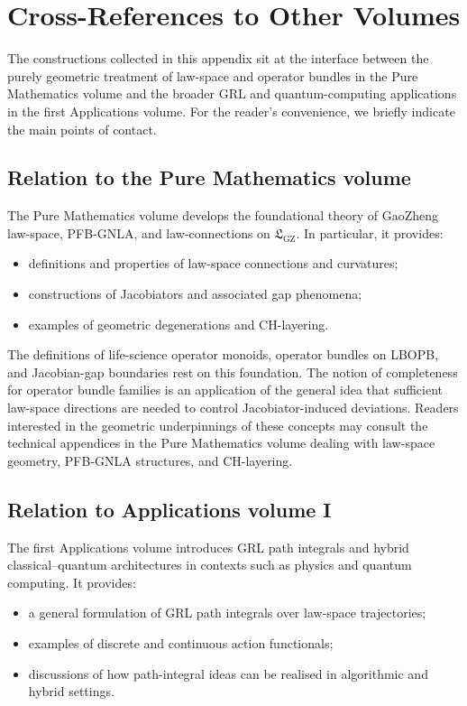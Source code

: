 \documentclass[11pt]{book}
\theoremstyle{plain}
\theoremstyle{definition}
\theoremstyle{remark}
\newcommand{\GZLS}{\ensuremath{\mathfrak{L}_{\mathrm{GZ}}}}       \newcommand{\GZLT}{\ensuremath{M_{!w}}}                           \newcommand{\GZLOC}{\ensuremath{A_M}}                             \newcommand{\GZLCurv}{\ensuremath{\mathcal{F}_{\mathrm{law}}}}
\begin{document}
\section{Cross-References to Other Volumes}


The constructions collected in this appendix sit at the interface
between the purely geometric treatment of law-space and operator
bundles in the Pure Mathematics volume and the broader GRL and
quantum-computing applications in the first Applications volume.
For the reader's convenience, we briefly indicate the main points of
contact.

\subsection*{Relation to the Pure Mathematics volume}

The Pure Mathematics volume develops the foundational theory of
GaoZheng law-space, PFB-GNLA, and law-connections on $\GZLS$. In
particular, it provides:

\begin{itemize}
  \item definitions and properties of law-space connections and
        curvatures;
  \item constructions of Jacobiators and associated gap phenomena;
  \item examples of geometric degenerations and CH-layering.
\end{itemize}

The definitions of life-science operator monoids, operator bundles on
LBOPB, and Jacobian-gap boundaries rest on this foundation. The notion
of completeness for operator bundle families is an application of the
general idea that sufficient law-space directions are needed to
control Jacobiator-induced deviations. Readers interested in the
geometric underpinnings of these concepts may consult the technical
appendices in the Pure Mathematics volume dealing with law-space
geometry, PFB-GNLA structures, and CH-layering.

\subsection*{Relation to Applications volume I}

The first Applications volume introduces GRL path integrals and
hybrid classical--quantum architectures in contexts such as physics
and quantum computing. It provides:

\begin{itemize}
  \item a general formulation of GRL path integrals over law-space
        trajectories;
  \item examples of discrete and continuous action functionals;
  \item discussions of how path-integral ideas can be realised in
        algorithmic and hybrid settings.
\end{itemize}
\end{document}
